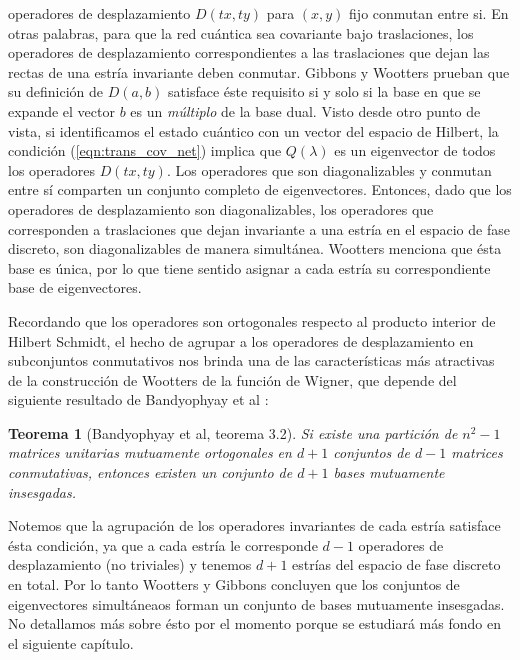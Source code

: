 \documentclass[a4paper]{report}
\newtheorem{theorem}{Teorema}
\begin{document}
  operadores de desplazamiento $D(tx,ty)$ para $(x,y)$ fijo
  conmutan entre si. En otras palabras, para que la red
  cuántica sea covariante bajo traslaciones, los operadores
  de desplazamiento correspondientes a las traslaciones que
  dejan las rectas de una estría invariante deben conmutar.
  Gibbons y Wootters prueban que su definición de $D(a,b)$
  satisface éste requisito si y solo si la base en que se
  expande el vector $b$ es un \textit{múltiplo} de la base
  dual. Visto desde otro punto de vista, si identificamos el
  estado cuántico con un vector del espacio de Hilbert, la
  condición (\ref{eqn:trans_cov_net}) implica que
  $Q(\lambda)$ es un eigenvector de todos los operadores
  $D(tx,ty)$. Los operadores que son diagonalizables y
  conmutan entre sí comparten un conjunto completo de
  eigenvectores. Entonces, dado que los operadores de
  desplazamiento son diagonalizables, los operadores que
  corresponden a traslaciones que dejan invariante a una
  estría en el espacio de fase discreto, son diagonalizables
  de manera simultánea. Wootters menciona que ésta base es
  única, por lo que tiene sentido asignar a cada estría su
  correspondiente base de eigenvectores.

  Recordando que los operadores son ortogonales respecto al
  producto interior de Hilbert Schmidt, el hecho de agrupar
  a los operadores de desplazamiento en subconjuntos
  conmutativos nos brinda una de las características más
  atractivas de la construcción de Wootters de la función de
  Wigner, que depende del siguiente resultado de Bandyophyay
  et al \cite{bandyopadhyay2001}:
  \begin{theorem}[Bandyophyay et al, teorema 3.2]
    \label{thm:bandy}
    Si existe una partición de $n^2-1$ matrices unitarias
    mutuamente ortogonales en $d+1$ conjuntos de $d-1$
    matrices conmutativas, entonces existen un conjunto de
    $d+1$ bases mutuamente insesgadas.
  \end{theorem}
  Notemos que la agrupación de los operadores invariantes de
  cada estría satisface ésta condición, ya que a cada estría
  le corresponde $d-1$ operadores de desplazamiento (no
  triviales) y tenemos $d+1$ estrías del espacio de fase
  discreto en total. Por lo tanto Wootters y Gibbons
  concluyen que los conjuntos de eigenvectores simultáneaos
  forman un conjunto de bases mutuamente insesgadas. No
  detallamos más sobre ésto por el momento porque se
  estudiará más fondo en el siguiente capítulo.
\end{document}
